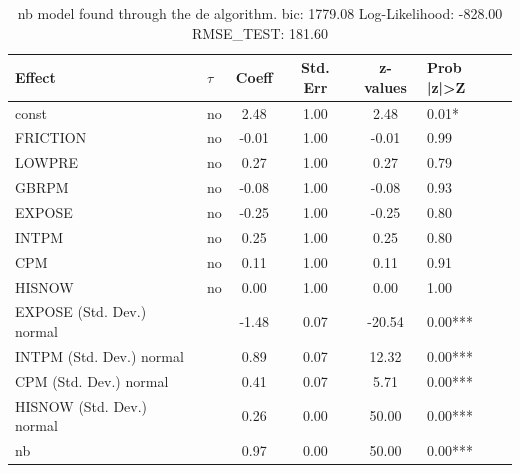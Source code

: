 \begin{table}
	\caption{nb model found through the de algorithm. bic: 1779.08 Log-Likelihood: -828.00 RMSE_TEST: 181.60}
	\begin{center}
		\begin{tabular}{|l|l|c|c|c|l|}
			\hline
			Effect & $\tau$ & Coeff & Std. Err & z-values & Prob |z|>Z \\
			\hline
			const & no & 2.48 & 1.00 & 2.48 & 0.01* \\
			\hline
			FRICTION & no & -0.01 & 1.00 & -0.01 & 0.99 \\
			\hline
			LOWPRE & no & 0.27 & 1.00 & 0.27 & 0.79 \\
			\hline
			GBRPM & no & -0.08 & 1.00 & -0.08 & 0.93 \\
			\hline
			EXPOSE & no & -0.25 & 1.00 & -0.25 & 0.80 \\
			\hline
			INTPM & no & 0.25 & 1.00 & 0.25 & 0.80 \\
			\hline
			CPM & no & 0.11 & 1.00 & 0.11 & 0.91 \\
			\hline
			HISNOW & no & 0.00 & 1.00 & 0.00 & 1.00 \\
			\hline
			EXPOSE (Std. Dev.) normal &  & -1.48 & 0.07 & -20.54 & 0.00*** \\
			\hline
			INTPM (Std. Dev.) normal &  & 0.89 & 0.07 & 12.32 & 0.00*** \\
			\hline
			CPM (Std. Dev.) normal &  & 0.41 & 0.07 & 5.71 & 0.00*** \\
			\hline
			HISNOW (Std. Dev.) normal &  & 0.26 & 0.00 & 50.00 & 0.00*** \\
			\hline
			nb &  & 0.97 & 0.00 & 50.00 & 0.00*** \\
			\hline
		\end{tabular}
	\end{center}
\end{table}
